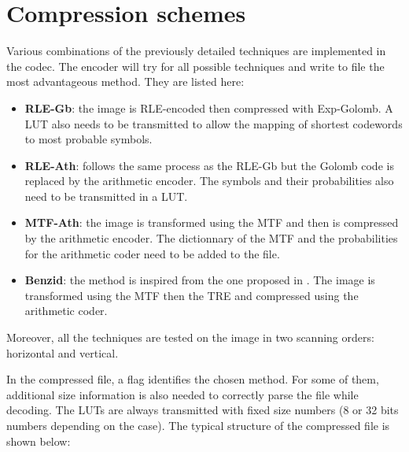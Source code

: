 \section{Compression schemes}

Various combinations of the previously detailed techniques are implemented in the codec. The encoder will try for all possible techniques and write to file the most advantageous method. They are listed here:

\begin{itemize}
	\item \textbf{RLE-Gb}: the image is RLE-encoded then compressed with Exp-Golomb. A LUT also needs to be transmitted to allow the mapping of shortest codewords to most probable symbols.
	
	\item \textbf{RLE-Ath}: follows the same process as the RLE-Gb but the Golomb code is replaced by the arithmetic encoder. The symbols and their probabilities also need to be transmitted in a LUT.
	
	\item \textbf{MTF-Ath}: the image is transformed using the MTF and then is compressed by the arithmetic encoder. The dictionnary of the MTF and the probabilities for the arithmetic coder need to be added to the file.
	
	\item \textbf{Benzid}: the method is inspired from the one proposed in \cite{benzid}. The image is transformed using the MTF then the TRE and compressed using the arithmetic coder.
\end{itemize}

Moreover, all the techniques are tested on the image in two scanning orders: horizontal and vertical.

In the compressed file, a flag identifies the chosen method. For some of them, additional size information is also needed to correctly parse the file while decoding. The LUTs are always transmitted with fixed size numbers (8 or 32 bits numbers depending on the case). The typical structure of the compressed file is shown below:


